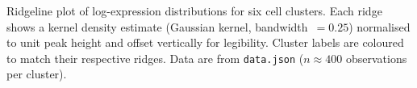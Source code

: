 \caption{Ridgeline plot of log-expression distributions for six cell clusters. Each ridge shows a kernel density estimate (Gaussian kernel, bandwidth~$= 0.25$) normalised to unit peak height and offset vertically for legibility. Cluster labels are coloured to match their respective ridges. Data are from \texttt{data.json} ($n \approx 400$ observations per cluster).}
